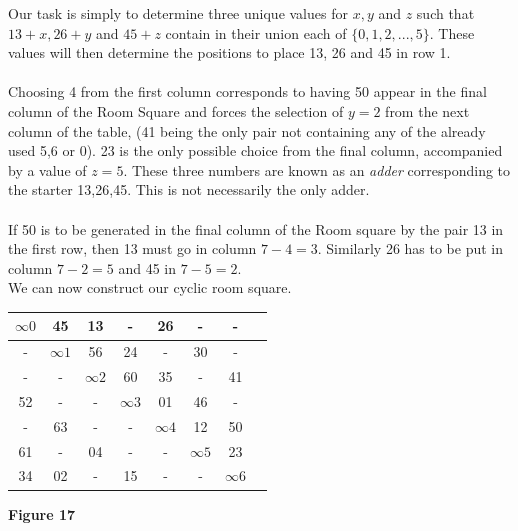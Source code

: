 \documentclass[
  12pt,
  a4paper]{book}
\begin{document}
Our task is simply to determine three unique values for \(x,y\) and \(z\)
such that \(13+x,26+y\) and \(45+z\) contain in their union each of
\(\{0,1,2,...,5\}\). These values will then determine the positions to
place 13, 26 and 45 in row 1.\\
~\\
Choosing 4 from the first column corresponds to having 50 appear in the
final column of the Room Square and forces the selection of \(y=2\) from
the next column of the table, (41 being the only pair not containing any
of the already used 5,6 or 0). 23 is the only possible choice from the
final column, accompanied by a value of \(z=5\). These three numbers are
known as an \emph{adder} corresponding to the starter 13,26,45. This is not
necessarily the only adder.\\
~\\
If 50 is to be generated in the final column of the Room square by the
pair 13 in the first row, then 13 must go in column \(7-4=3\). Similarly
26 has to be put in column \(7-2=5\) and 45 in \(7-5=2\).\\
We can now construct our cyclic room square.

\begin{longtable}[]{@{}cccccccl@{}}
\toprule
\(\infty 0\) & 45 & 13 & - & 26 & - & - &\tabularnewline
\midrule
\endhead
- & \(\infty 1\) & 56 & 24 & - & 30 & - &\tabularnewline
- & - & \(\infty 2\) & 60 & 35 & - & 41 &\tabularnewline
52 & - & - & \(\infty 3\) & 01 & 46 & - &\tabularnewline
- & 63 & - & - & \(\infty 4\) & 12 & 50 &\tabularnewline
61 & - & 04 & - & - & \(\infty 5\) & 23 &\tabularnewline
34 & 02 & - & 15 & - & - & \(\infty 6\) &\tabularnewline
\bottomrule
\end{longtable}

\textbf{Figure 17}
\end{document}
